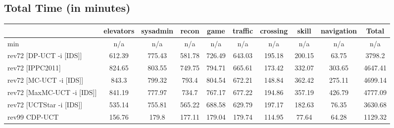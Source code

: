 \documentclass{article}
\begin{document}
\bigskip

\subsection*{Total Time (in minutes)}

\begin{tabular}{|l|r@{$\pm$}rr@{$\pm$}rr@{$\pm$}rr@{$\pm$}rr@{$\pm$}rr@{$\pm$}rr@{$\pm$}rr@{$\pm$}rr@{$\pm$}r|}
\hline

& \multicolumn{2}{c}{elevators}
& \multicolumn{2}{c}{sysadmin}
& \multicolumn{2}{c}{recon}
& \multicolumn{2}{c}{game}
& \multicolumn{2}{c}{traffic}
& \multicolumn{2}{c}{crossing}
& \multicolumn{2}{c}{skill}
& \multicolumn{2}{c}{navigation}
& \multicolumn{2}{c|}{Total}
\\
\hline
\hline
min
& \multicolumn{2}{c}{n/a}
& \multicolumn{2}{c}{n/a}
& \multicolumn{2}{c}{n/a}
& \multicolumn{2}{c}{n/a}
& \multicolumn{2}{c}{n/a}
& \multicolumn{2}{c}{n/a}
& \multicolumn{2}{c}{n/a}
& \multicolumn{2}{c}{n/a}
& \multicolumn{2}{c|}{n/a}
\\
rev72 [DP-UCT -i [IDS]]
& \multicolumn{2}{c}{612.39}
& \multicolumn{2}{c}{775.43}
& \multicolumn{2}{c}{581.78}
& \multicolumn{2}{c}{726.49}
& \multicolumn{2}{c}{643.03}
& \multicolumn{2}{c}{195.18}
& \multicolumn{2}{c}{200.15}
& \multicolumn{2}{c}{63.75}
& \multicolumn{2}{c|}{3798.2}
\\
rev72 [IPPC2011]
& \multicolumn{2}{c}{824.65}
& \multicolumn{2}{c}{803.55}
& \multicolumn{2}{c}{749.75}
& \multicolumn{2}{c}{794.71}
& \multicolumn{2}{c}{665.61}
& \multicolumn{2}{c}{173.42}
& \multicolumn{2}{c}{332.07}
& \multicolumn{2}{c}{303.65}
& \multicolumn{2}{c|}{4647.41}
\\
rev72 [MC-UCT -i [IDS]]
& \multicolumn{2}{c}{843.3}
& \multicolumn{2}{c}{799.32}
& \multicolumn{2}{c}{793.4}
& \multicolumn{2}{c}{804.54}
& \multicolumn{2}{c}{672.21}
& \multicolumn{2}{c}{148.84}
& \multicolumn{2}{c}{362.42}
& \multicolumn{2}{c}{275.11}
& \multicolumn{2}{c|}{4699.14}
\\
rev72 [MaxMC-UCT -i [IDS]]
& \multicolumn{2}{c}{841.19}
& \multicolumn{2}{c}{777.97}
& \multicolumn{2}{c}{734.7}
& \multicolumn{2}{c}{767.17}
& \multicolumn{2}{c}{677.22}
& \multicolumn{2}{c}{194.86}
& \multicolumn{2}{c}{357.19}
& \multicolumn{2}{c}{426.79}
& \multicolumn{2}{c|}{4777.09}
\\
rev72 [UCTStar -i [IDS]]
& \multicolumn{2}{c}{535.14}
& \multicolumn{2}{c}{755.81}
& \multicolumn{2}{c}{565.22}
& \multicolumn{2}{c}{688.58}
& \multicolumn{2}{c}{629.79}
& \multicolumn{2}{c}{197.17}
& \multicolumn{2}{c}{182.63}
& \multicolumn{2}{c}{76.35}
& \multicolumn{2}{c|}{3630.68}
\\
\hline
rev99 CDP-UCT
& \multicolumn{2}{c}{156.76}
& \multicolumn{2}{c}{179.8}
& \multicolumn{2}{c}{177.11}
& \multicolumn{2}{c}{179.04}
& \multicolumn{2}{c}{179.74}
& \multicolumn{2}{c}{114.95}
& \multicolumn{2}{c}{77.64}
& \multicolumn{2}{c}{64.28}
& \multicolumn{2}{c|}{1129.32}
\\
\hline
\end{tabular}%
\end{document}
